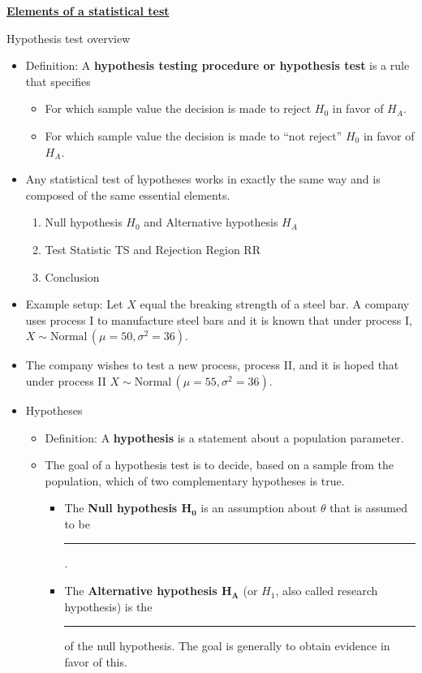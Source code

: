 \documentclass{article}
\newcommand{\bu}[1]{\textbf{\ul{#1}}}				%
\newcommand{\blankul}[1]{\rule[-1.5mm]{#1}{0.15mm}}	%
\newcommand{\ho}{H_0}		%
\newcommand{\ha}{H_A}		%
\newcommand{\follow}[1]{\sim \text{#1}\,}		%
\begin{document}
\newpage

\bu{Elements of a statistical test}\bigskip

Hypothesis test overview\bigskip
\begin{itemize}
    \item Definition: A \textbf{hypothesis testing procedure or hypothesis test} is a rule that specifies
    \begin{itemize}
        \item For which sample value the decision is made to reject $\ho$ in favor of $\ha$.
        \item For which sample value the decision is made to ``not reject'' $\ho$ in favor of $\ha$.
    \end{itemize}\bigskip
    \item Any statistical test of hypotheses works in exactly the same way and is composed of the same essential elements.
    \begin{enumerate}
        \item Null hypothesis $\ho$ and Alternative hypothesis $\ha$
        \item Test Statistic TS and Rejection Region RR
        \item Conclusion
    \end{enumerate}\bigskip
    \item Example setup: Let $X$ equal the breaking strength of a steel bar. A company uses process I to manufacture steel bars and it is known that under process I, \\$X \follow{Normal}(\mu = 50, \sigma^2 = 36)$.
    \item[] The company wishes to test a new process, process II, and it is hoped that under process II
$X \follow{Normal}(\mu = 55, \sigma^2 = 36)$.\bigskip
    \item Hypotheses
    \begin{itemize}
        \item Definition: A \textbf{hypothesis} is a statement about a population parameter.
        \item The goal of a hypothesis test is to decide, based on a sample from the population, which of two complementary hypotheses is true.
        \begin{itemize}
            \item The \textbf{Null hypothesis $\boldsymbol{\ho}$} is an assumption about $\theta$ that is assumed to be \blankul{1cm}.
            \item The \textbf{Alternative hypothesis $\boldsymbol{\ha}$} (or $H_1$, also called research hypothesis) is the \blankul{3cm} of the null hypothesis. The goal is generally to obtain evidence in favor of this. 

\end{itemize}
\end{itemize}
\end{itemize}
\end{document}
